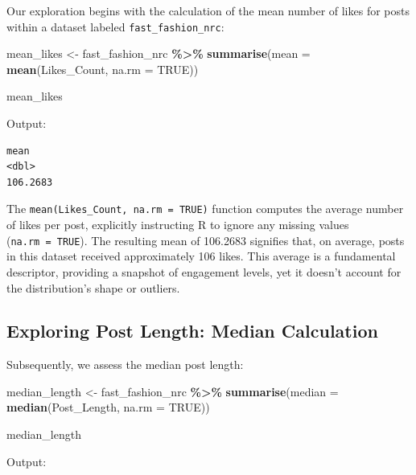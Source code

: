 \documentclass[
]{book}
\newenvironment{Shaded}{\begin{snugshade}}{\end{snugshade}}
\newcommand{\AttributeTok}[1]{\textcolor[rgb]{0.13,0.29,0.53}{#1}}
\newcommand{\ConstantTok}[1]{\textcolor[rgb]{0.56,0.35,0.01}{#1}}
\newcommand{\FunctionTok}[1]{\textcolor[rgb]{0.13,0.29,0.53}{\textbf{#1}}}
\newcommand{\NormalTok}[1]{#1}
\newcommand{\OtherTok}[1]{\textcolor[rgb]{0.56,0.35,0.01}{#1}}
\newcommand{\SpecialCharTok}[1]{\textcolor[rgb]{0.81,0.36,0.00}{\textbf{#1}}}
\begin{document}
Our exploration begins with the calculation of the mean number of likes for posts within a dataset labeled \texttt{fast\_fashion\_nrc}:

\begin{Shaded}
\begin{Highlighting}[]
\NormalTok{mean\_likes }\OtherTok{\textless{}{-}}\NormalTok{ fast\_fashion\_nrc }\SpecialCharTok{\%\textgreater{}\%}
  \FunctionTok{summarise}\NormalTok{(}\AttributeTok{mean =} \FunctionTok{mean}\NormalTok{(Likes\_Count, }\AttributeTok{na.rm =} \ConstantTok{TRUE}\NormalTok{))}

\NormalTok{mean\_likes}
\end{Highlighting}
\end{Shaded}

Output:

\begin{verbatim}
mean
<dbl>
106.2683
\end{verbatim}

The \texttt{mean(Likes\_Count,\ na.rm\ =\ TRUE)} function computes the average number of likes per post, explicitly instructing R to ignore any missing values (\texttt{na.rm\ =\ TRUE}). The resulting mean of 106.2683 signifies that, on average, posts in this dataset received approximately 106 likes. This average is a fundamental descriptor, providing a snapshot of engagement levels, yet it doesn't account for the distribution's shape or outliers.

\hypertarget{exploring-post-length-median-calculation}{%
\subsection{Exploring Post Length: Median Calculation}\label{exploring-post-length-median-calculation}}

Subsequently, we assess the median post length:

\begin{Shaded}
\begin{Highlighting}[]
\NormalTok{median\_length }\OtherTok{\textless{}{-}}\NormalTok{ fast\_fashion\_nrc }\SpecialCharTok{\%\textgreater{}\%}
  \FunctionTok{summarise}\NormalTok{(}\AttributeTok{median =} \FunctionTok{median}\NormalTok{(Post\_Length, }\AttributeTok{na.rm =} \ConstantTok{TRUE}\NormalTok{))}

\NormalTok{median\_length}
\end{Highlighting}
\end{Shaded}

Output:
\end{document}
